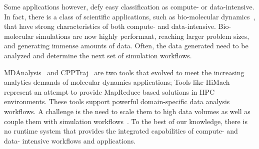 Some applications however, defy easy classification as compute- or data-intensive.
In fact, there is a class of scientific applications, such as bio-molecular dynamics~\cite{dror2012biomolecular}, that have strong characteristics of both compute- and data-intensive.
Bio-molecular simulations are now highly performant, reaching larger problem sizes, and generating immense amounts of data.
Often, the data generated need to be analyzed and determine the next set of simulation workflows.


MDAnalysis~\cite{michaud2011mdanalysis} and CPPTraj~\cite{roe2013ptraj} are two tools that evolved to meet the increasing analytics demands of molecular dynamics applications; 
Tools like HiMach~\cite{tu2008scalable} represent an attempt to provide MapReduce based solutions in HPC environments.
These tools support powerful domain-specific data analysis workflows.
A challenge is the need to scale them to high data volumes as well as couple them with simulation workflows~\cite{balasubramanian2016extasy}.
To the best of our knowledge, there is no runtime system that provides the integrated capabilities of compute- and data- intensive workflows and applications.


